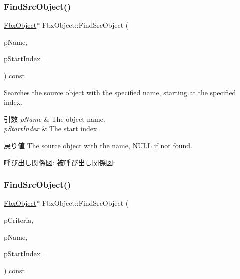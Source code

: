 \subsubsection{\texorpdfstring{Find\+Src\+Object()}{FindSrcObject()}\hspace{0.1cm}{\footnotesize\ttfamily [1/4]}}
{\footnotesize\ttfamily \hyperlink{class_fbx_object}{Fbx\+Object}$\ast$ Fbx\+Object\+::\+Find\+Src\+Object (\begin{DoxyParamCaption}\item[{const char $\ast$}]{p\+Name,  }\item[{int}]{p\+Start\+Index = {} }\end{DoxyParamCaption}) const}

Searches the source object with the specified name, starting at the specified index. 
\begin{DoxyParams}{引数}
{\em p\+Name} & The object name. \\
\hline
{\em p\+Start\+Index} & The start index. \\
\hline
\end{DoxyParams}
\begin{DoxyReturn}{戻り値}
The source object with the name, N\+U\+LL if not found. 
\end{DoxyReturn}
呼び出し関係図\+:
被呼び出し関係図\+:
\mbox{\label{class_fbx_object_abc939951e2e0de886642e2845f72b71d}} 
\subsubsection{\texorpdfstring{Find\+Src\+Object()}{FindSrcObject()}\hspace{0.1cm}{\footnotesize\ttfamily [2/4]}}
{\footnotesize\ttfamily \hyperlink{class_fbx_object}{Fbx\+Object}$\ast$ Fbx\+Object\+::\+Find\+Src\+Object (\begin{DoxyParamCaption}\item[{const \hyperlink{class_fbx_criteria}{Fbx\+Criteria} \&}]{p\+Criteria,  }\item[{const char $\ast$}]{p\+Name,  }\item[{int}]{p\+Start\+Index = {} }\end{DoxyParamCaption}) const}

